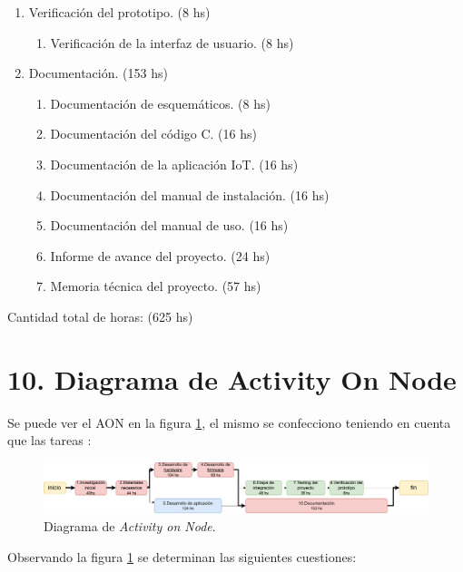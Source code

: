 \documentclass[
11pt, %
]{charter}
\begin{document}
\begin{enumerate}
\item Verificación del prototipo. (8 hs)
	\begin{enumerate}
	\item Verificación de la interfaz de usuario. (8 hs)
	\end{enumerate}	
	
\item Documentación. (153 hs)
	\begin{enumerate}
	\item Documentación de esquemáticos. (8 hs)
	\item Documentación del código C. (16 hs)
	\item Documentación de la aplicación IoT. (16 hs)
	\item Documentación del manual de instalación. (16 hs)
	\item Documentación del manual de uso. (16 hs)
	\item Informe de avance del proyecto. (24 hs)
	\item Memoria técnica del proyecto. (57 hs)

	\end{enumerate}


\end{enumerate}

Cantidad total de horas: (625 hs)

\newpage

\section{10. Diagrama de Activity On Node}
\label{sec:AoN}


Se puede ver el AON en la figura \ref{fig:AoN}, el mismo se confecciono teniendo en cuenta que las tareas :

\begin{figure}[htpb]
\centering 
\includegraphics[width=1.0 \textwidth, height=.3 \textwidth]{./Figuras/AONProyecto.pdf}
\caption{Diagrama de \textit{Activity on Node}.}
\label{fig:AoN}
\end{figure}


Observando  la figura  \ref{fig:AoN} se determinan las siguientes cuestiones:
\end{document}
